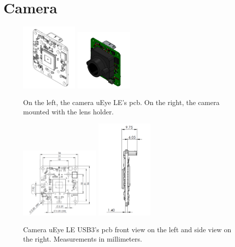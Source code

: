 \section{Camera}
\label{appendix:cha2:camera}

\begin{figure}[ht]
	\centering
	\includegraphics[width=0.25\textwidth]{images/camview.png}
	\includegraphics[width=0.25\textwidth]{images/camwlens.png}
	\caption[Camera uEye LE USB3]{On the left, the camera uEye LE's \acrshort{pcb}. On the right, the camera mounted with the lens holder.}
	\label{appendix:cha2:camview}
\end{figure}

\begin{figure}[ht]
	\centering
	\includegraphics[width=0.35\textwidth]{images/camfronttview.png}
	\includegraphics[width=0.25\textwidth]{images/camsideview.png}
	\caption[Camera uEye LE USB3's \acrshort{pcb}]{Camera uEye LE USB3's \acrshort{pcb} front view on the left and side view on the right. Measurements in millimeters.}
	\label{appendix:cha2:camsides}
\end{figure}

